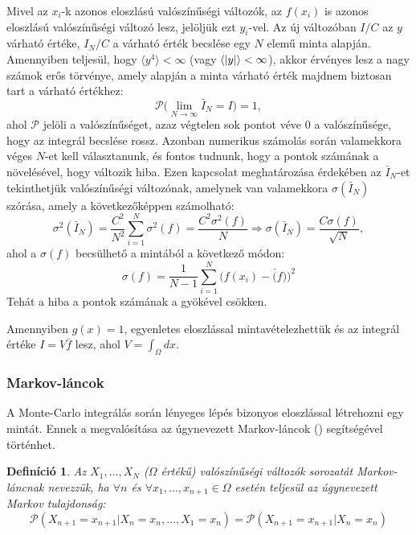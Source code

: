 \documentclass[10pt,a4paper]{article}
\numberwithin{equation}{subsection}
\numberwithin{figure}{section}
\newtheorem{definition}{Definíció}[section]
\begin{document}
Mivel az $x_i$-k azonos eloszlású valószínűségi változók, az $f(x_i)$ is azonos eloszlású valószínűségi változó lesz, jelöljük ezt $y_i$-vel. Az új változóban $I/C$ az $y$ várható értéke, $I_N/C$ a várható érték becslése egy $N$ elemű minta alapján. Amennyiben teljesül, hogy $\langle y^4\rangle<\infty$ (vagy $\langle \abs{y}\rangle<\infty$), akkor érvényes lesz a nagy számok erős törvénye, amely alapján a minta várható érték majdnem biztosan tart a várható értékhez:
\begin{equation}
\mathcal{P}\Big(\lim_{N\rightarrow\infty}\bar{I}_N=I\Big)=1,
\end{equation}
ahol $\mathcal{P}$ jelöli a valószínűséget, azaz végtelen sok pontot véve $0$ a valószínűsége, hogy az integrál becslése rossz. Azonban numerikus számolás során valamekkora véges $N$-et kell választanunk, és fontos tudnunk, hogy a pontok számának a növelésével, hogy változik hiba. Ezen kapcsolat meghatározása érdekében az $\bar{I}_{N}$-et tekinthetjük valószínűségi változónak, amelynek van valamekkora $\sigma({\bar{I}_N})$ szórása, amely a következőképpen számolható:
\begin{equation}
\sigma^2({\bar{I}_N})=\frac{C^2}{N^2}\sum_{i=1}^N\sigma^2(f)=\frac{C^2\sigma^2(f)}{N}\Longrightarrow \sigma(\bar{I}_N)=\frac{C\sigma(f)}{\sqrt{N}},
\end{equation}
ahol a $\sigma(f)$ becsülhető a mintából a következő módon:
\begin{equation}
\sigma(f)=\frac{1}{N-1}\sum_{i=1}^N\big(f(x_i)-\bar(f)\big)^2
\end{equation}
Tehát a hiba a pontok számának a gyökével csökken.

Amennyiben $g(x)=1$, egyenletes eloszlással mintavételezhettük és az integrál értéke $I=V\bar{f}$ lesz, ahol $V=\int_\Omega dx$.

\subsubsection{Markov-láncok}

A Monte-Carlo integrálás során lényeges lépés bizonyos eloszlással létrehozni egy mintát. Ennek a megvalósítása az úgynevezett Markov-láncok (\cite{norris1998markov}) segítségével történhet. 

\begin{definition}
Az $X_1,\dots,X_N$ ($\Omega$ értékű) valószínűségi változók sorozatát Markov-láncnak nevezzük, ha $\forall n$ és $\forall x_1,\dots,x_{n+1}\in\Omega$ esetén teljesül az úgynevezett Markov tulajdonság:
\begin{equation}
\mathcal{P}(X_{n+1}=x_{n+1}|X_n=x_n,\dots,X_1=x_n)=\mathcal{P}(X_{n+1}=x_{n+1}|X_n=x_n)
\end{equation}
\end{definition}
\end{document}
